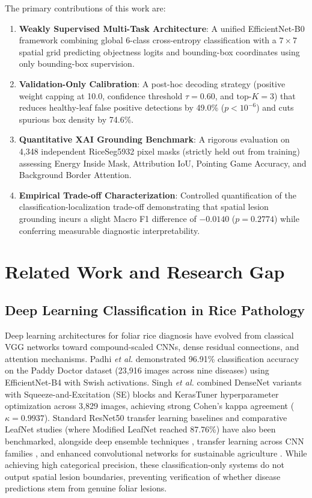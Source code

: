 \documentclass[conference]{IEEEtran}
\begin{document}
The primary contributions of this work are:
\begin{enumerate}
    \item \textbf{Weakly Supervised Multi-Task Architecture}: A unified EfficientNet-B0 framework combining global 6-class cross-entropy classification with a $7\times 7$ spatial grid predicting objectness logits and bounding-box coordinates using only bounding-box supervision.
    \item \textbf{Validation-Only Calibration}: A post-hoc decoding strategy (positive weight capping at 10.0, confidence threshold $\tau = 0.60$, and $\text{top-}K = 3$) that reduces healthy-leaf false positive detections by 49.0\% ($p < 10^{-6}$) and cuts spurious box density by 74.6\%.
    \item \textbf{Quantitative XAI Grounding Benchmark}: A rigorous evaluation on 4,348 independent RiceSeg5932 pixel masks (strictly held out from training) assessing Energy Inside Mask, Attribution IoU, Pointing Game Accuracy, and Background Border Attention.
    \item \textbf{Empirical Trade-off Characterization}: Controlled quantification of the classification-localization trade-off demonstrating that spatial lesion grounding incurs a slight Macro F1 difference of $-0.0140$ ($p = 0.2774$) while conferring measurable diagnostic interpretability.
\end{enumerate}

\section{Related Work and Research Gap}
\label{sec:related_work}

\subsection{Deep Learning Classification in Rice Pathology}
Deep learning architectures for foliar rice diagnosis have evolved from classical VGG networks \cite{ref13} toward compound-scaled CNNs, dense residual connections, and attention mechanisms. Padhi \textit{et al.} \cite{ref15} demonstrated 96.91\% classification accuracy on the Paddy Doctor dataset (23,916 images across nine diseases) using EfficientNet-B4 with Swish activations. Singh \textit{et al.} \cite{ref2} combined DenseNet variants with Squeeze-and-Excitation (SE) blocks and KerasTuner hyperparameter optimization across 3,829 images, achieving strong Cohen's kappa agreement ($\kappa = 0.9937$). Standard ResNet50 transfer learning baselines \cite{ref19} and comparative LeafNet studies \cite{ref17} (where Modified LeafNet reached 87.76\%) have also been benchmarked, alongside deep ensemble techniques \cite{ref11}, transfer learning across CNN families \cite{ref10}, and enhanced convolutional networks for sustainable agriculture \cite{ref16}. While achieving high categorical precision, these classification-only systems do not output spatial lesion boundaries, preventing verification of whether disease predictions stem from genuine foliar lesions.
\end{document}
